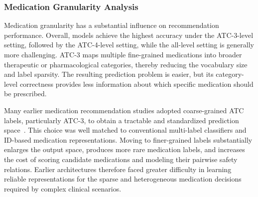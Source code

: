 \documentclass[manuscript,review]{acmart}
\begin{document}


\subsubsection{Medication Granularity Analysis}
Medication granularity has a substantial influence on recommendation performance. Overall, models achieve the highest accuracy under the ATC-3-level setting, followed by the ATC-4-level setting, while the all-level setting is generally more challenging. ATC-3 maps multiple fine-grained medications into broader therapeutic or pharmacological categories, thereby reducing the vocabulary size and label sparsity. The resulting prediction problem is easier, but its category-level correctness provides less information about which specific medication should be prescribed.

Many earlier medication recommendation studies adopted coarse-grained ATC labels, particularly ATC-3, to obtain a tractable and standardized prediction space~\cite{shang2019gamenet,yang2021safedrug}. This choice was well matched to conventional multi-label classifiers and ID-based medication representations. Moving to finer-grained labels substantially enlarges the output space, produces more rare medication labels, and increases the cost of scoring candidate medications and modeling their pairwise safety relations. Earlier architectures therefore faced greater difficulty in learning reliable representations for the sparse and heterogeneous medication decisions required by complex clinical scenarios.
\end{document}
